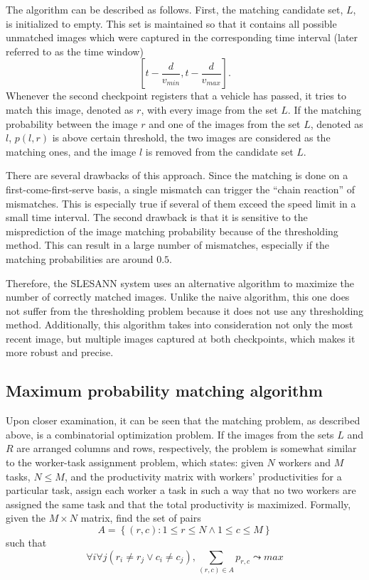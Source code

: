 \documentclass[times, utf8, zavrsni]{fer}
\begin{document}
The algorithm can be described as follows. First, the matching candidate set,
$L$, is initialized to empty. This set is maintained so that it contains all
possible unmatched images which were captured in the corresponding time interval
(later referred to as the time window) \[ [t - \frac{d}{v_{min}}, t -
\frac{d}{v_{max}}]. \] Whenever the second checkpoint registers that a vehicle
has passed, it tries to match this image, denoted as $r$, with every image from the set $L$.
If the matching probability between the image $r$ and one of the images from the
set $L$, denoted as $l$, $p(l, r)$ is above certain threshold, the two images
are considered as the matching ones, and the image $l$ is removed from the
candidate set $L$.

There are several drawbacks of this approach. Since the matching is done on a
first-come-first-serve basis, a single mismatch can trigger the
``chain reaction'' of mismatches. This is especially true if several of them
exceed the speed limit in a small time interval. The second drawback is that it
is sensitive to the misprediction of the image matching probability because of
the thresholding method. This can result in a large number of mismatches,
especially if the matching probabilities are around $0.5$.

Therefore, the SLESANN system uses an alternative algorithm to maximize the
number of correctly matched images. Unlike the naive algorithm, this one does
not suffer from the thresholding problem because it does not use any
thresholding method. Additionally, this algorithm takes into consideration not
only the most recent image, but multiple images captured at both checkpoints,
which makes it more robust and precise.

\subsection{Maximum probability matching algorithm}

Upon closer examination, it can be seen that the matching problem, as described
above, is a combinatorial optimization problem. If the images from the sets $L$
and $R$ are arranged columns and rows, respectively, the problem is somewhat
similar to the worker-task assignment problem, which states: given $N$ workers
and $M$ tasks, $N \leq M$, and the productivity matrix with workers'
productivities for a particular task, assign each worker a task in such a way
that no two workers are assigned the same task and that the total productivity
is maximized. Formally, given the $M \times N$ matrix, find the set of pairs \[
A = \left\{(r, c) : 1 \leq r \leq N \land 1 \leq c \leq M \right\} \] such that
\[ \forall i \forall j (r_i \neq r_j \lor c_i \neq c_j), \sum_{(r, c) \in A}{p_{r,
c}} \leadsto max \]
\end{document}
